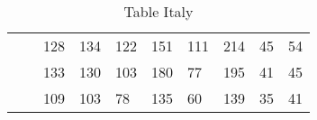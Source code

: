 \begin{table}[h]
\begin{tabular}{ll|l|l|l|l|l|l|l|l|}
\multicolumn{1}{|l|}{}                     &                                          & 128             & 134           & 122             & 151           & 111             & 214           & 45              & 54            \\ \cline{3-10} 
\multicolumn{1}{|l|}{}                     &                                          & 133             & 130           & 103             & 180           & 77              & 195           & 41              & 45            \\ \cline{3-10} 
\multicolumn{1}{|l|}{}                     &                                          & 109             & 103           & 78              & 135           & 60              & 139           & 35              & 41            \\ \hline
\end{tabular}
\caption{Table Italy}
\end{table}